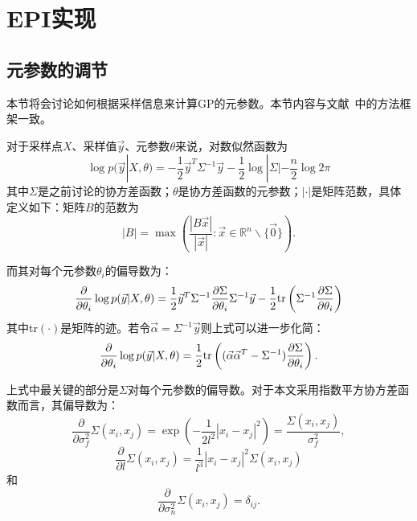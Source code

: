 \documentclass[index]{subfiles}
\begin{document}

\section{EPI实现} %
\label{cha:EPI Implementation}

\subsection{元参数的调节} %
\label{sec:Adaptation of hyperparameters}

本节将会讨论如何根据采样信息来计算GP的元参数。本节内容与文献~中的方法框架一致。

对于采样点$X$、采样值$\vec{y}$、元参数$\theta$来说，对数似然函数为
\begin{equation}
    \log p(\vec{y}|X, \theta) = -\frac{1}{2}\vec{y}^{T}\Sigma^{-1}\vec{y} - \frac{1}{2}\log|\Sigma| - \frac{n}{2} \log 2\pi
\end{equation}
其中$\Sigma$是之前讨论的协方差函数；$\theta$是协方差函数的元参数；$|\cdot|$是矩阵范数，具体定义如下：矩阵$B$的范数为
\begin{equation}
    |B| = \max \left( \frac{|B\vec{x}|}{|\vec{x}|} : \vec{x} \in \mathbb{R}^{n}\backslash\{\vec{0}\} \right).
\end{equation}

而其对每个元参数$\theta_{i}$的偏导数为：
\begin{equation}
    \frac{\partial}{\partial \theta_{i}} \log p(\vec{y}|X,\theta) = \frac{1}{2}\vec{y}^{T}\Sigma^{-1}\frac{\partial \Sigma}{\partial \theta_{i}} \Sigma^{-1}\vec{y} - \frac{1}{2} {\rm tr}\left( \Sigma^{-1}\frac{\partial \Sigma}{\partial \theta_{i}} \right)
\end{equation}
其中tr$(\cdot)$是矩阵的迹。若令$\vec{\alpha} = \Sigma^{-1}\vec{y}$则上式可以进一步化简：
\begin{equation}
    \frac{\partial}{\partial \theta_{i}} \log p(\vec{y}|X,\theta) = \frac{1}{2} {\rm tr}\left((\vec{\alpha}\vec{\alpha}^{T} - \Sigma^{-1})\frac{\partial \Sigma}{\partial \theta_{i}}\right).
\end{equation}

上式中最关键的部分是$\Sigma$对每个元参数的偏导数。对于本文采用指数平方协方差函数而言，其偏导数为：
\begin{equation}
    \frac{\partial}{\partial \sigma_{f}^{2}} \Sigma(x_{i}, x_{j}) = \exp\left( -\frac{1}{2l^{2}} |x_{i} - x_{j}|^{2}\right) = \frac{\Sigma(x_{i}, x_{j})}{\sigma_{f}^{2}},
\end{equation}
\begin{equation}
    \frac{\partial}{\partial l} \Sigma(x_{i}, x_{j}) = \frac{1}{l^{3}}|x_{i} - x_{j}|^{2}\Sigma(x_{i}, x_{j})
\end{equation}
和
\begin{equation}
    \frac{\partial}{\partial \sigma_{n}^{2}} \Sigma(x_{i}, x_{j}) = \delta_{ij}.
\end{equation}
\end{document}
